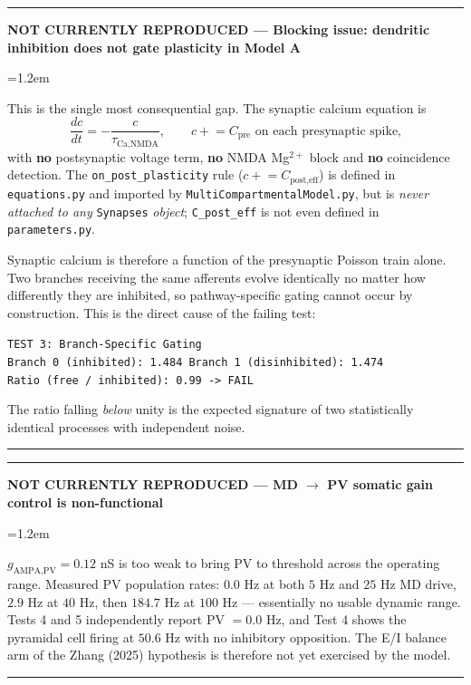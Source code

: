 \documentclass[11pt,a4paper]{article}
\newenvironment{gapbox}[1]{%
  \par\medskip\noindent
  \textcolor{gapred}{\rule{\linewidth}{1.1pt}}\par\nobreak\vspace{2pt}%
  \noindent\textcolor{gapred}{\textbf{NOT CURRENTLY REPRODUCED --- #1}}%
  \par\nobreak\vspace{3pt}%
  \begingroup\leftskip=1.2em\relax\small
}{%
  \par\endgroup\vspace{3pt}%
  \noindent\textcolor{gapred}{\rule{\linewidth}{0.5pt}}\par\medskip
}
\begin{document}
\begin{gapbox}{Blocking issue: dendritic inhibition does not gate plasticity in Model A}
This is the single most consequential gap. The synaptic calcium equation is
\begin{equation}
    \frac{dc}{dt} = -\frac{c}{\tau_{\text{Ca,NMDA}}},
    \qquad c \mathrel{+}= C_{\text{pre}} \text{ on each presynaptic spike,}
\end{equation}
with \textbf{no} postsynaptic voltage term, \textbf{no} NMDA Mg$^{2+}$ block and
\textbf{no} coincidence detection. The \texttt{on\_post\_plasticity} rule
($c \mathrel{+}= C_{\text{post,eff}}$) is defined in \texttt{equations.py} and imported
by \texttt{MultiCompartmentalModel.py}, but is \emph{never attached to any}
\texttt{Synapses} \emph{object}; \texttt{C\_post\_eff} is not even defined in
\texttt{parameters.py}.

Synaptic calcium is therefore a function of the presynaptic Poisson train alone. Two
branches receiving the same afferents evolve identically no matter how differently they
are inhibited, so pathway-specific gating cannot occur by construction. This is the
direct cause of the failing test:
\begin{center}
\texttt{TEST 3: Branch-Specific Gating}\\
\texttt{Branch 0 (inhibited): 1.484 \quad Branch 1 (disinhibited): 1.474}\\
\texttt{Ratio (free / inhibited): 0.99 -> FAIL}
\end{center}
The ratio falling \emph{below} unity is the expected signature of two statistically
identical processes with independent noise.
\end{gapbox}

\begin{gapbox}{MD $\rightarrow$ PV somatic gain control is non-functional}
$g_{\text{AMPA,PV}} = 0.12$ nS is too weak to bring PV to threshold across the
operating range. Measured PV population rates: $0.0$ Hz at both $5$ Hz and $25$ Hz MD
drive, $2.9$ Hz at $40$ Hz, then $184.7$ Hz at $100$ Hz --- essentially no usable
dynamic range. Tests 4 and 5 independently report PV $= 0.0$ Hz, and Test 4 shows the
pyramidal cell firing at $50.6$ Hz with no inhibitory opposition. The E/I balance arm
of the Zhang (2025) hypothesis is therefore not yet exercised by the model.
\end{gapbox}
\end{document}
